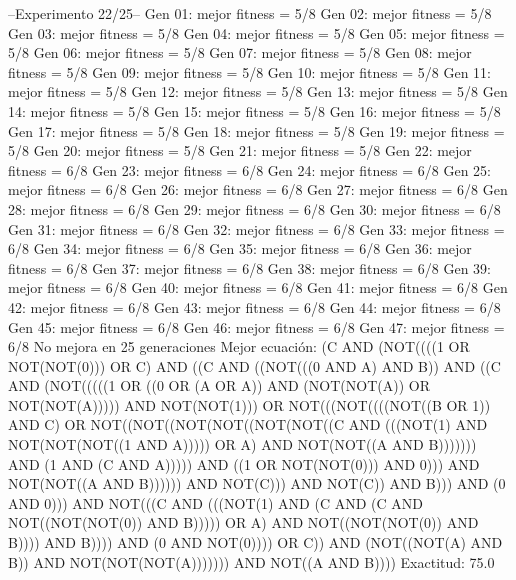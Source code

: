 --Experimento 
 22/25--
Gen 01: mejor fitness = 5/8
Gen 02: mejor fitness = 5/8
Gen 03: mejor fitness = 5/8
Gen 04: mejor fitness = 5/8
Gen 05: mejor fitness = 5/8
Gen 06: mejor fitness = 5/8
Gen 07: mejor fitness = 5/8
Gen 08: mejor fitness = 5/8
Gen 09: mejor fitness = 5/8
Gen 10: mejor fitness = 5/8
Gen 11: mejor fitness = 5/8
Gen 12: mejor fitness = 5/8
Gen 13: mejor fitness = 5/8
Gen 14: mejor fitness = 5/8
Gen 15: mejor fitness = 5/8
Gen 16: mejor fitness = 5/8
Gen 17: mejor fitness = 5/8
Gen 18: mejor fitness = 5/8
Gen 19: mejor fitness = 5/8
Gen 20: mejor fitness = 5/8
Gen 21: mejor fitness = 5/8
Gen 22: mejor fitness = 6/8
Gen 23: mejor fitness = 6/8
Gen 24: mejor fitness = 6/8
Gen 25: mejor fitness = 6/8
Gen 26: mejor fitness = 6/8
Gen 27: mejor fitness = 6/8
Gen 28: mejor fitness = 6/8
Gen 29: mejor fitness = 6/8
Gen 30: mejor fitness = 6/8
Gen 31: mejor fitness = 6/8
Gen 32: mejor fitness = 6/8
Gen 33: mejor fitness = 6/8
Gen 34: mejor fitness = 6/8
Gen 35: mejor fitness = 6/8
Gen 36: mejor fitness = 6/8
Gen 37: mejor fitness = 6/8
Gen 38: mejor fitness = 6/8
Gen 39: mejor fitness = 6/8
Gen 40: mejor fitness = 6/8
Gen 41: mejor fitness = 6/8
Gen 42: mejor fitness = 6/8
Gen 43: mejor fitness = 6/8
Gen 44: mejor fitness = 6/8
Gen 45: mejor fitness = 6/8
Gen 46: mejor fitness = 6/8
Gen 47: mejor fitness = 6/8
No mejora en 25 generaciones
Mejor ecuación: (C AND (NOT((((1 OR NOT(NOT(0))) OR C) AND ((C AND ((NOT(((0 AND A) AND B)) AND ((C AND (NOT(((((1 OR ((0 OR (A OR A)) AND (NOT(NOT(A)) OR NOT(NOT(A))))) AND NOT(NOT(1))) OR NOT(((NOT((((NOT((B OR 1)) AND C) OR NOT((NOT((NOT(NOT((NOT(NOT((C AND (((NOT(1) AND NOT(NOT(NOT((1 AND A))))) OR A) AND NOT(NOT((A AND B))))))) AND (1 AND (C AND A))))) AND ((1 OR NOT(NOT(0))) AND 0))) AND NOT(NOT((A AND B)))))) AND NOT(C))) AND NOT(C)) AND B))) AND (0 AND 0))) AND NOT(((C AND (((NOT(1) AND (C AND (C AND NOT((NOT(NOT(0)) AND B))))) OR A) AND NOT((NOT(NOT(0)) AND B)))) AND B)))) AND (0 AND NOT(0)))) OR C)) AND (NOT((NOT(A) AND B)) AND NOT(NOT(NOT(A))))))) AND NOT((A AND B))))
 Exactitud: 75.0%

